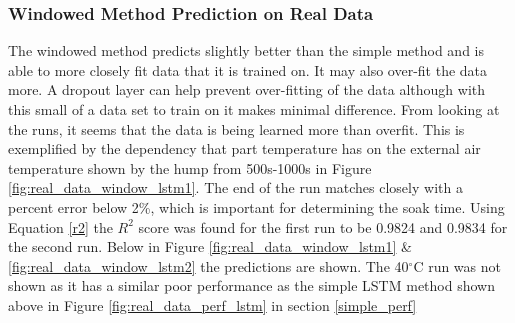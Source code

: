 \subsubsection{Windowed Method Prediction on Real Data}
The windowed method predicts slightly better than the simple method and is able to more closely fit data that it is trained on. It may also over-fit the data more. A dropout layer can help prevent over-fitting of the data although with this small of a data set to train on it makes minimal difference. From looking at the runs, it seems that the data is being learned more than overfit. This is exemplified by the dependency that part temperature has on the external air temperature shown by the hump from 500s-1000s in Figure \ref{fig:real_data_window_lstm1}. The end of the run matches closely with a percent error below 2\%, which is important for determining the soak time. Using Equation \ref{r2} the $R^2$ score was found for the first run to be 0.9824 and 0.9834 for the second run. Below in Figure \ref{fig:real_data_window_lstm1} \& \ref{fig:real_data_window_lstm2} the predictions are shown. The 40$^\circ$C run was not shown as it has a similar poor performance as the simple LSTM method shown above in Figure \ref{fig:real_data_perf_lstm} in section \ref{simple_perf}
